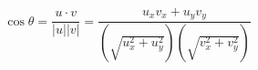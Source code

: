 \documentclass[12pt]{article}
\begin{document}
\[
    \cos \theta = \frac{u \cdot v}{|u||v|} = \frac{u_xv_x + u_yv_y}{(\sqrt{u_x^2 + u_y^2})(\sqrt{v_x^2 + v_y^2})}
\]
\end{document}
